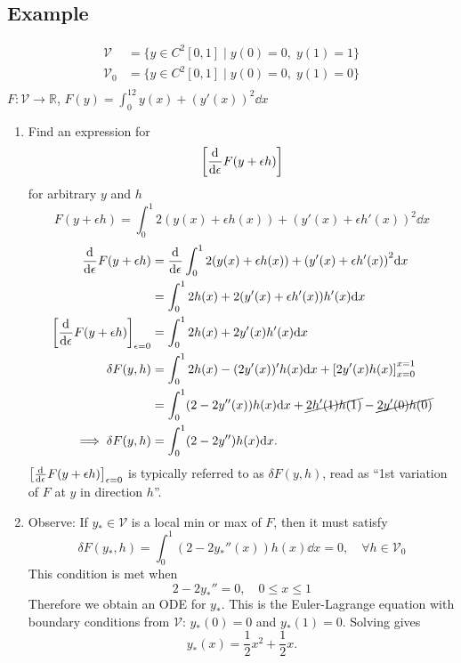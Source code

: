 \documentclass[12pt,twoside]{article}
\begin{document}
\subsection{Example}
\begin{equation*}
  \begin{aligned}
    \mathcal{V}&=\{y\in C^2[0,1]\;|\;y(0)=0,\; y(1)=1\} \\
    \mathcal{V}_0&= \{y\in C^2[0,1]\;|\;y(0)=0,\; y(1)=0\} \\
  \end{aligned}
\end{equation*}
$F:\mathcal{V}\rightarrow\mathbb{R}$, $F(y)=\int_0^12y(x)+{(y'(x))}^2\dd{x}$
\begin{enumerate}
\item Find an expression for
$$\left[\frac{\mathrm{d}^{} {}}{\mathrm{d}{\epsilon}^{}}F(y+\epsilon h)\right]$$ for arbitrary $y$ and $h$
$$F(y+\epsilon h)=\int_0^1 2(y(x)+\epsilon h(x))+{(y'(x)+\epsilon h'(x))}^2\dd{x}$$
\begin{equation*}
  \begin{aligned}
    \frac{\mathrm{d}^{} {}}{\mathrm{d}{\epsilon}^{}}F(y+\epsilon h) &=
    \frac{\mathrm{d}^{} {}}{\mathrm{d}{\epsilon}^{}}\int_0^1 2(y(x)+\epsilon h(x))+{(y'(x)+\epsilon h'(x))}^2\mathrm{d}{x} \\
    &= \int_0^1 2 h(x) + 2(y'(x)+\epsilon h'(x))h'(x)\mathrm{d}{x} \\
    {\left[\frac{\mathrm{d}^{} {}}{\mathrm{d}{\epsilon}^{}}F(y+\epsilon h)\right]}_{\epsilon=0} &= \int_0^1 2h(x)+2y'(x)h'(x)\mathrm{d}{x} \\
    \delta F(y,h) &= \int_0^1 2h(x) - (2y'(x))' h(x) \mathrm{d}{x} + {\left[ 2y'(x)h(x) \right]}_{x=0}^{x=1} \\
    &= \int_0^1(2-2y''(x))h(x)\mathrm{d}{x} + \cancel{2h'(1)h(1)} - \cancel{2y'(0)h(0)} \\
    \implies \delta F(y,h) &= \int_0^1(2-2y'')h(x)\mathrm{d}{x}.
  \end{aligned}
\end{equation*}
$\left[\frac{\mathrm{d}^{} {}}{\mathrm{d}{\epsilon}^{}}F(y+\epsilon h)\right]_{\epsilon=0}$ is typically referred
to as $\delta F(y,h)$, read as ``1st variation of $F$ at $y$ in direction
$h$''.
\item Observe: If $y_*\in\mathcal{V}$ is a local min or max of $F$, then it must
  satisfy
$$\delta F(y_*,h)=\int_0^1(2-2y_*''(x))h(x)\dd{x}=0,\quad \forall
h\in\mathcal{V_0}$$
This condition is met when
$$2-2y_*''=0,\quad 0\le x\le 1$$
Therefore we obtain an ODE for $y_*$. This is the Euler-Lagrange equation with
boundary conditions from $\mathcal{V}$: $y_*(0)=0$ and $y_*(1)=0$. Solving gives
$$y_*(x)=\frac{1}{2}x^2 + \frac{1}{2}x.$$
\begin{figure}[ht]

\end{figure}
\end{enumerate}
\end{document}
